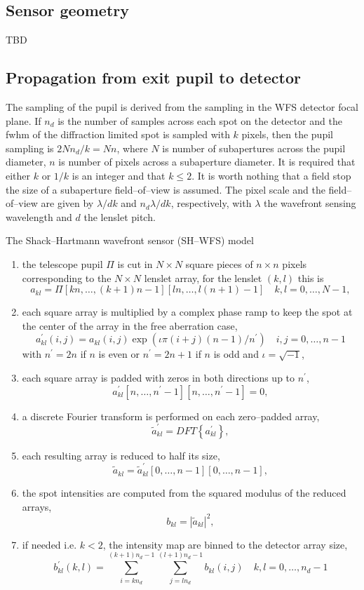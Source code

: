 \subsection{Sensor geometry}
\label{subsec:sh-wfs-geometry}

TBD

\subsection{Propagation from exit pupil to detector}
\label{subsec:sh-wfs-propagation}

\mbox{}

The sampling of the pupil is derived from the sampling in the WFS detector
focal plane.
If $n_d$ is the number of samples across each spot on the detector and the
fwhm of the
diffraction limited spot is sampled with $k$ pixels, then the pupil sampling is
$2Nn_d/k=Nn$, where $N$ is number of subapertures across the pupil diameter,
$n$ is number of pixels across a subaperture diameter.
It is required that either $k$ or $1/k$ is an integer and that $k\leq 2$.
It is worth nothing that a field stop the size of a subaperture
field--of--view is assumed.
The pixel scale  and the field--of--view are given by $\lambda/dk$ and
$n_d\lambda/dk$, respectively, with $\lambda$ the wavefront sensing
wavelength and $d$ the lenslet pitch.

The Shack--Hartmann wavefront sensor (SH--WFS) model
\begin{enumerate}
\item the telescope pupil $\Pi$ is cut in $N\times N$ square pieces of
$n\times n$ pixels corresponding to the $N\times N$ lenslet array, for the
lenslet $(k,l)$ this is $$a_{kl} =
\Pi[kn,\dots,(k+1)n-1][ln,\dots,l(n+1)-1]\quad k,l=0,\dots,N-1,$$
\item each square array is multiplied by a complex phase ramp to keep the
spot at the center of the array in the free aberration case,
$$a_{kl}^\prime(i,j) = a_{kl}(i,j)\exp(\iota \pi (i+j)(n-1)/n^\prime)\quad
i,j=0,\dots,n-1$$ with $n^\prime=2n$ if $n$ is even or  $n^\prime=2n+1$ if $n$
 is odd and $\iota=\sqrt{-1}$,
\item each square array is padded with zeros in both directions up to
$n^\prime$,$$a_{kl}^\prime[n,\dots,n^\prime-1][n,\dots,n^\prime-1]=0,$$
\item a discrete Fourier transform is performed on each zero--padded array,
$$\tilde a_{kl}^\prime = DFT\left\{a_{kl}^\prime\right\},$$
\item each resulting array is reduced to half its size, $$\tilde a_{kl} =
\tilde a_{kl}^\prime[0,\dots,n-1][0,\dots,n-1],$$
\item the spot intensities are computed from the squared modulus of the
reduced arrays, $$b_{kl} = \left| \tilde a_{kl} \right|^2,$$
\item if needed i.e. $k<2$, the intensity map are binned to the detector
array size, $$b_{kl}^\prime(k,l) =
\sum_{i=kn_d}^{(k+1)n_d-1}\sum_{j=ln_d}^{(l+1)n_d-1} b_{kl}(i,j)\quad
k,l=0,\dots,n_d-1 $$
\end{enumerate}

